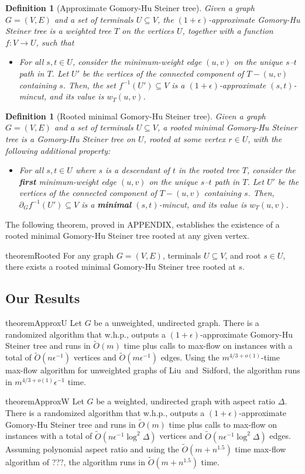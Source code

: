 \documentclass{article}
\newcommand{\s}{\subseteq}
\newcommand{\im}{\item}
\newcommand{\BI}{\begin{itemize}}
\newcommand{\EI}{\end{itemize}}
\newcommand{\inv}{^{-1}}
\newcommand{\e}{\epsilon}
\newcommand{\De}{\Delta}
\newcommand{\pt}{\partial}
\newcommand{\1}{\mathbbm 1}
\newtheorem{definition}[theorem]{Definition}
\newcommand{\BD}{\begin{definition}}
\newcommand{\ED}{\end{definition}}
\newcommand{\tO}{\tilde{O}}
\newcommand{\thml}[1]{\label{thm:#1}}
\renewcommand{\emph}[1]{\textbf{\textup{#1}}}
\begin{document}
\BD[Approximate Gomory-Hu Steiner tree]
Given a graph $G=(V,E)$ and a set of terminals $U\s V$, the $(1+\e)$-approximate Gomory-Hu Steiner tree is a weighted tree $T$ on the vertices $U$, together with a function $f:V\to U$, such that
 \BI
 \im For all $s,t\in U$, consider the minimum-weight edge $(u,v)$ on the unique $s$--$t$ path in $T$. Let $U'$ be the vertices of the connected component of $T-(u,v)$ containing $s$.
Then, the set $f\inv(U')\s V$ is a $(1+\e)$-approximate $(s,t)$-mincut, and its value is $w_T(u,v)$.
 \EI
\ED

\BD[Rooted minimal Gomory-Hu Steiner tree]
Given a graph $G=(V,E)$ and a set of terminals $U\s V$, a rooted minimal Gomory-Hu Steiner tree is a Gomory-Hu Steiner tree on $U$, rooted at some vertex $r\in U$, with the following additional property:
 \BI
 \im[$(*)$] For all $s,t\in U$ where $s$ is a descendant of $t$ in the rooted tree $T$, consider the \emph{first} minimum-weight edge $(u,v)$ on the unique $s$--$t$ path in $T$. Let $U'$ be the vertices of the connected component of $T-(u,v)$ containing $s$.
Then, $\pt_Gf\inv(U')\s V$ is a \emph{minimal} $(s,t)$-mincut, and its value is $w_T(u,v)$.
 \EI
\ED

The following theorem, proved in APPENDIX, establishes the existence of a rooted minimal Gomory-Hu Steiner tree rooted at any given vertex.

\begin{restatable}{theorem}{Rooted}\thml{rooted}
For any graph $G=(V,E)$, terminals $U\s V$, and root $s\in U$, there exists a rooted minimal Gomory-Hu Steiner tree rooted at $s$.
\end{restatable}

\subsection{Our Results}

\begin{restatable}{theorem}{ApproxU}\thml{approx-u}
Let $G$ be a unweighted, undirected graph. There is a randomized algorithm that w.h.p., outputs a $(1+\e)$-approximate Gomory-Hu Steiner tree and runs in $\tO(m)$ time plus calls to max-flow on instances with a total of $\tO(n\e\inv)$ vertices and $\tO(m\e\inv)$ edges. Using the $m^{4/3+o(1)}$-time max-flow algorithm for unweighted graphs of Liu~and~Sidford, the algorithm runs in $m^{4/3+o(1)}\e\inv$ time.
\end{restatable}
\begin{restatable}{theorem}{ApproxW}\thml{approx-w}
Let $G$ be a weighted, undirected graph with aspect ratio $\De$.
There is a randomized algorithm that w.h.p., outputs a $(1+\e)$-approximate Gomory-Hu Steiner tree and runs in $\tO(m)$ time plus calls to max-flow on instances with a total of $\tO(n\e\inv\log^2\De)$ vertices and $\tO(n\e\inv\log^2\De)$ edges. Assuming polynomial aspect ratio and using the $\tO(m+n^{1.5})$ time max-flow algorithm of ???, the algorithm runs in $\tO(m+n^{1.5})$ time.
\end{restatable}
\end{document}
